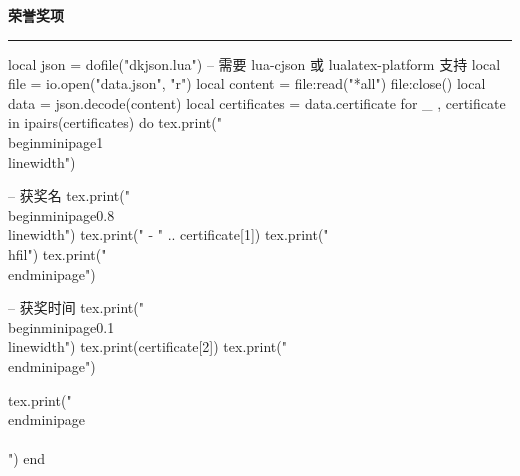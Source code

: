 \documentclass[10pt, a4paper, oneside]{ctexart}
\begin{document}
\ifdefined\certificate
\begin{minipage}{1\textwidth}
    \large{\textbf{荣誉奖项}}
\end{minipage}
\rule{\linewidth}{\lineSize}
\begin{center}
    \begin{minipage}{0.9\textwidth}
        \begin{luacode}
            local json = dofile("dkjson.lua")  -- 需要 lua-cjson 或 lualatex-platform 支持
            local file = io.open("data.json", "r")
            local content = file:read("*all")
            file:close()
            local data = json.decode(content)
            local certificates = data.certificate
            for _ , certificate in ipairs(certificates) do
                tex.print("\\begin{minipage}{1\\linewidth}")

                -- 获奖名
                tex.print("\\begin{minipage}{0.8\\linewidth}")
                tex.print(" - " .. certificate[1])
                tex.print("\\hfil")
                tex.print("\\end{minipage}")

                -- 获奖时间
                tex.print("\\begin{minipage}{0.1\\linewidth}")
                tex.print(certificate[2])
                tex.print("\\end{minipage}")

                tex.print("\\end{minipage}\\\\[0.5em]")
            end
        \end{luacode}
    \end{minipage}
\end{center}
\fi
\end{document}
